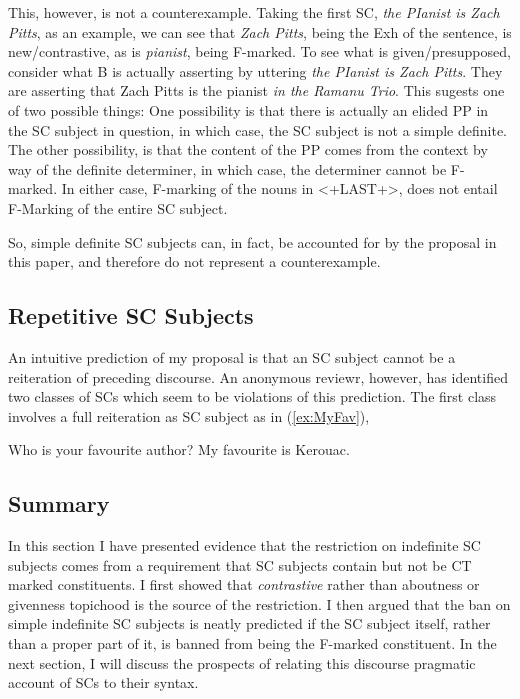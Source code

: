 \documentclass[
	letterpaper,
]{article}
\begin{document}
This, however, is not a counterexample.
Taking the first SC, \textit{the PIanist is Zach Pitts}, as an example, we can see that \textit{Zach Pitts}, being the Exh of the sentence, is new/contrastive, as is \textit{pianist}, being F-marked.
To see what is given/presupposed, consider what B is actually asserting by uttering \textit{the PIanist is Zach Pitts}.
They are asserting that Zach Pitts is the pianist \textit{in the Ramanu Trio}.
This sugests one of two possible things:
One possibility is that there is actually an elided PP in the SC subject in question, in which case, the SC subject is not a simple definite.
The other possibility, is that the content of the PP comes from the context by way of the definite determiner, in which case, the determiner cannot be F-marked.
In either case, F-marking of the nouns in <+LAST+>, does not entail F-Marking of the entire SC subject.

So, simple definite SC subjects can, in fact, be accounted for by the proposal in this paper, and therefore do not represent a counterexample.
\subsection{Repetitive SC Subjects}
An intuitive prediction of my proposal is that an SC subject cannot be a reiteration of preceding discourse.
An anonymous reviewr, however, has identified two classes of SCs which seem to be violations of this prediction.
The first class involves a full reiteration as SC subject as in (\ref{ex:MyFav}), 
\begin{exe}
	\ex\label{ex:MyFav}
	\begin{xlist}
		 Who is your favourite author?
		 My favourite is Kerouac.
	\end{xlist}
\end{exe}
\subsection{Summary}
In this section I have presented evidence that the restriction on indefinite SC subjects comes from a requirement that SC subjects contain but not be CT marked constituents.
I first showed that \textit{contrastive} rather than aboutness or givenness topichood is the source of the restriction.
I then argued that the ban on simple indefinite SC subjects is neatly predicted if the SC subject itself, rather than a proper part of it, is banned from being the F-marked constituent.
In the next section, I will discuss the prospects of relating this discourse pragmatic account of SCs to their syntax.
\end{document}
